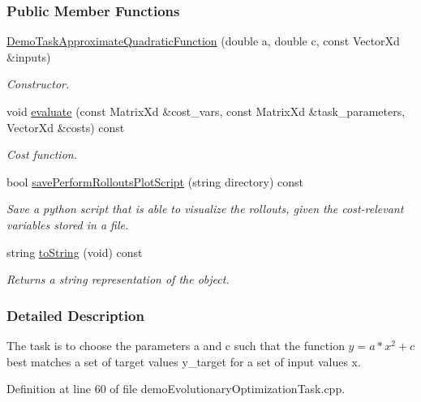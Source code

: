 \subsubsection*{Public Member Functions}
\begin{DoxyCompactItemize}
\item 
\hyperlink{classDemoTaskApproximateQuadraticFunction_ac81f6a65537026fd59d52478253e1661}{Demo\+Task\+Approximate\+Quadratic\+Function} (double a, double c, const Vector\+Xd \&inputs)
\begin{DoxyCompactList}\small\item\em Constructor. \end{DoxyCompactList}\item 
void \hyperlink{classDemoTaskApproximateQuadraticFunction_a0f2698f5da124e2a2df8e5894b42d612}{evaluate} (const Matrix\+Xd \&cost\+\_\+vars, const Matrix\+Xd \&task\+\_\+parameters, Vector\+Xd \&costs) const 
\begin{DoxyCompactList}\small\item\em Cost function. \end{DoxyCompactList}\item 
bool \hyperlink{classDemoTaskApproximateQuadraticFunction_a7ae605c4456b382c9d4ecccc1379213d}{save\+Perform\+Rollouts\+Plot\+Script} (string directory) const 
\begin{DoxyCompactList}\small\item\em Save a python script that is able to visualize the rollouts, given the cost-\/relevant variables stored in a file. \end{DoxyCompactList}\item 
string \hyperlink{classDemoTaskApproximateQuadraticFunction_a1aca816b42cf0d36118be0ab91120d77}{to\+String} (void) const 
\begin{DoxyCompactList}\small\item\em Returns a string representation of the object. \end{DoxyCompactList}\end{DoxyCompactItemize}


\subsubsection{Detailed Description}
The task is to choose the parameters a and c such that the function $ y = a*x^2 + c $ best matches a set of target values y\+\_\+target for a set of input values x. 

Definition at line 60 of file demo\+Evolutionary\+Optimization\+Task.\+cpp.



